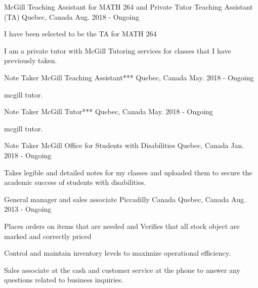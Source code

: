 \begin{cventries}
  \cventry
    {McGill Teaching Assistant for MATH 264 and Private Tutor}
    {Teaching Assistant (TA)}
    {Quebec, Canada}
    {Aug. 2018 - Ongoing}
    {
      \begin{cvitems}
        \item {I have been selected to be the TA for MATH 264}
        \item {I am a private tutor with McGill Tutoring services for classes that I have previously taken.}
      \end{cvitems}
    } \newline
  \cventry
    {Note Taker}
    {McGill Teaching Assistant***}
    {Quebec, Canada}
    {May. 2018 - Ongoing}
    {
      \begin{cvitems}
        \item {mcgill tutor.}
      \end{cvitems}
    }\newline
    \cventry
    {Note Taker}
    {McGill Tutor***}
    {Quebec, Canada}
    {May. 2018 - Ongoing}
    {
      \begin{cvitems}
        \item {mcgill tutor.}
      \end{cvitems}
    }\newline
    \cventry
    {Note Taker}
    {McGill Office for Students with Disabilities }
    {Quebec, Canada}
    {Jan. 2018 - Ongoing}
    {
      \begin{cvitems}
        \item {Takes legible and detailed notes for my classes and uploaded them to secure the academic success of students with disabilities.}
      \end{cvitems}
    }\newline
  \cventry
    {General manager and sales associate}
    {Piccadilly Canada}
    {Quebec, Canada}
    {Aug. 2013 - Ongoing}
    {
      \begin{cvitems}
        \item {Places orders on items that are needed and Verifies that all stock object are marked and correctly priced}
        \item {Control and maintain inventory levels to maximize operational efficiency.}
        \item {Sales associate at the cash and customer service at the phone to answer any questions related to business inquiries.}
      \end{cvitems}
    }\newline
\end{cventries}
